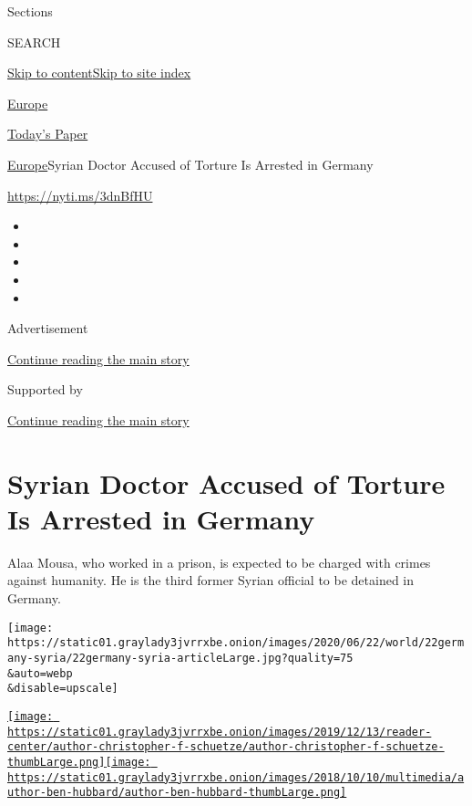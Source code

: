 Sections

SEARCH

\protect\hyperlink{site-content}{Skip to
content}\protect\hyperlink{site-index}{Skip to site index}

\href{https://www.nytimes3xbfgragh.onion/section/world/europe}{Europe}

\href{https://myaccount.nytimes3xbfgragh.onion/auth/login?response_type=cookie\&client_id=vi}{}

\href{https://www.nytimes3xbfgragh.onion/section/todayspaper}{Today's
Paper}

\href{/section/world/europe}{Europe}\textbar{}Syrian Doctor Accused of
Torture Is Arrested in Germany

\url{https://nyti.ms/3dnBfHU}

\begin{itemize}
\item
\item
\item
\item
\item
\end{itemize}

Advertisement

\protect\hyperlink{after-top}{Continue reading the main story}

Supported by

\protect\hyperlink{after-sponsor}{Continue reading the main story}

\hypertarget{syrian-doctor-accused-of-torture-is-arrested-in-germany}{%
\section{Syrian Doctor Accused of Torture Is Arrested in
Germany}\label{syrian-doctor-accused-of-torture-is-arrested-in-germany}}

Alaa Mousa, who worked in a prison, is expected to be charged with
crimes against humanity. He is the third former Syrian official to be
detained in Germany.

\texttt{[image: https://static01.graylady3jvrrxbe.onion/images/2020/06/22/world/22germany-syria/22germany-syria-articleLarge.jpg?quality=75\\\&auto=webp\\\&disable=upscale]}

\href{https://www.nytimes3xbfgragh.onion/by/christopher-f-schuetze}{\texttt{[image: https://static01.graylady3jvrrxbe.onion/images/2019/12/13/reader-center/author-christopher-f-schuetze/author-christopher-f-schuetze-thumbLarge.png]}}\href{https://www.nytimes3xbfgragh.onion/by/ben-hubbard}{\texttt{[image: https://static01.graylady3jvrrxbe.onion/images/2018/10/10/multimedia/author-ben-hubbard/author-ben-hubbard-thumbLarge.png]}}

